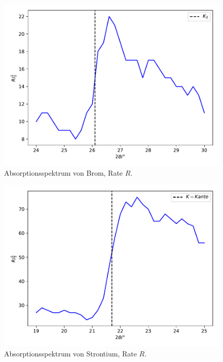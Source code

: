 \begin{figure}
  \centering
  \includegraphics[scale=0.7]{Brom.pdf}
  \caption{Absorptionsspektrum von Brom, Rate $R$.}
  \label{abb:brom} %
\end{figure}
\begin{figure}
  \centering
  \includegraphics[scale=0.7]{Strontium.pdf}
  \caption{Absorptionsspektrum von Strontium, Rate $R$.}
  \label{abb:strontium} %
\end{figure}
